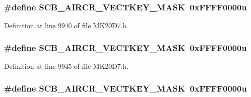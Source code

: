 \subsubsection[{\texorpdfstring{S\+C\+B\+\_\+\+A\+I\+R\+C\+R\+\_\+\+V\+E\+C\+T\+K\+E\+Y\+\_\+\+M\+A\+SK}{SCB_AIRCR_VECTKEY_MASK}}]{\setlength{\rightskip}{0pt plus 5cm}\#define S\+C\+B\+\_\+\+A\+I\+R\+C\+R\+\_\+\+V\+E\+C\+T\+K\+E\+Y\+\_\+\+M\+A\+SK~0x\+F\+F\+F\+F0000u}\hypertarget{group___s_c_b___register___masks_ga0929f6fe9ab80dd345abdc59f44fc492}{}\label{group___s_c_b___register___masks_ga0929f6fe9ab80dd345abdc59f44fc492}


Definition at line 9940 of file M\+K20\+D7.\+h.

\subsubsection[{\texorpdfstring{S\+C\+B\+\_\+\+A\+I\+R\+C\+R\+\_\+\+V\+E\+C\+T\+K\+E\+Y\+\_\+\+M\+A\+SK}{SCB_AIRCR_VECTKEY_MASK}}]{\setlength{\rightskip}{0pt plus 5cm}\#define S\+C\+B\+\_\+\+A\+I\+R\+C\+R\+\_\+\+V\+E\+C\+T\+K\+E\+Y\+\_\+\+M\+A\+SK~0x\+F\+F\+F\+F0000u}\hypertarget{group___s_c_b___register___masks_ga0929f6fe9ab80dd345abdc59f44fc492}{}\label{group___s_c_b___register___masks_ga0929f6fe9ab80dd345abdc59f44fc492}


Definition at line 9945 of file M\+K20\+D7.\+h.

\subsubsection[{\texorpdfstring{S\+C\+B\+\_\+\+A\+I\+R\+C\+R\+\_\+\+V\+E\+C\+T\+K\+E\+Y\+\_\+\+M\+A\+SK}{SCB_AIRCR_VECTKEY_MASK}}]{\setlength{\rightskip}{0pt plus 5cm}\#define S\+C\+B\+\_\+\+A\+I\+R\+C\+R\+\_\+\+V\+E\+C\+T\+K\+E\+Y\+\_\+\+M\+A\+SK~0x\+F\+F\+F\+F0000u}\hypertarget{group___s_c_b___register___masks_ga0929f6fe9ab80dd345abdc59f44fc492}{}\label{group___s_c_b___register___masks_ga0929f6fe9ab80dd345abdc59f44fc492}


